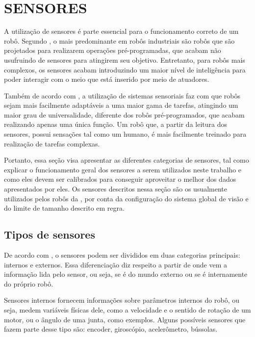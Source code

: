 \documentclass[acronym, symbols, table]{fei}
\begin{document}
	\section{SENSORES} \label{sec:sensores}
	
		A utilização de sensores é parte essencial para o funcionamento correto de um robô. Segundo \textcite{de2017tipos}, o mais predominante em robôs industriais são robôs que são projetados para realizarem operações pré-programadas, que acabam não usufruindo de sensores para atingirem seu objetivo. Entretanto, para robôs mais complexos, os sensores acabam introduzindo um maior nível de inteligência para poder interagir com o meio que está inserido por meio de atuadores.
		
		Também de acordo com \textcite{de2017tipos}, a utilização de sistemas sensoriais faz com que robôs sejam mais facilmente adaptáveis a uma maior gama de tarefas, atingindo um maior grau de universalidade, diferente dos robôs pré-programados, que acabam realizando apenas uma única função. Um robô que, a partir da leitura dos sensores, possui sensações tal como um humano, é mais facilmente treinado para realização de tarefas complexas.
		
		Portanto, essa seção visa apresentar as diferentes categorias de sensores, tal como explicar o funcionamento geral dos sensores a serem utilizados neste trabalho e como eles devem ser calibrados para conseguir aproveitar o melhor dos dados apresentados por eles. Os sensores descritos nessa seção são os usualmente utilizados pelos robôs da , por conta da configuração do sistema global de visão e do limite de tamanho descrito em regra.
		
		\subsection{Tipos de sensores}		
		
			De acordo com \textcite{sensorFusionKalmanFilter}, o sensores podem ser divididos em duas categorias principais: internos e externos. Essa diferenciação diz respeito a partir de onde vem a informação lida pelo sensor, ou seja, se é do mundo externo ou se é internamente do próprio robô.
			
			Sensores internos fornecem informações sobre parâmetros internos do robô, ou seja, medem variáveis físicas dele, como a velocidade e o sentido de rotação de um motor, ou o ângulo de uma junta, como exemplos. Alguns possíveis sensores que fazem parte desse tipo são: encoder, giroscópio, acelerômetro, bússolas.
			
\end{document}
